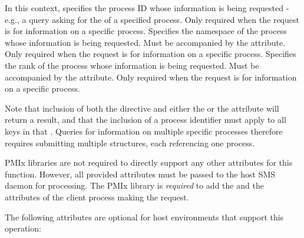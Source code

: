 In this context, specifies the process ID whose information is being requested - e.g., a query asking for the  of a specified process. Only required when the request is for information on a specific process.
\pasteAttributeItemEnd
{}Specifies the namespace of the process whose information is being requested. Must be accompanied by the  attribute. Only required when the request is for information on a specific process.
\pasteAttributeItemEnd
{}Specifies the rank of the process whose information is being requested. Must be accompanied by the  attribute. Only required when the request is for information on a specific process.
\pasteAttributeItemEnd
{}

Note that inclusion of both the  directive and either the  or the  attribute will return a  result, and that the inclusion of a process identifier must apply to all keys in that . Queries for information on multiple specific processes therefore requires submitting multiple  structures, each referencing one process.

\ac{PMIx} libraries are not required to directly support any other attributes for this function. However, all provided attributes must be passed to the host \ac{SMS} daemon for processing. The \ac{PMIx} library is \textit{required} to add the  and the  attributes of the client process making the request.

\reqattrend

\optattrstart
The following attributes are optional for host environments that support this operation:

